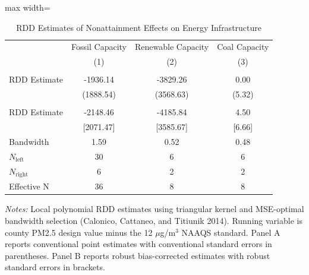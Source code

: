 \begin{table}[htbp]
\centering
\caption{RDD Estimates of Nonattainment Effects on Energy Infrastructure}
\label{tab:main_results}
\begin{adjustbox}{max width=\textwidth}
\begin{tabular}{l*{3}{c}}
\toprule
 & Fossil Capacity & Renewable Capacity & Coal Capacity \\
 & (1) & (2) & (3) \\
\midrule
\addlinespace
\multicolumn{4}{l}{\textit{Panel A: Conventional}} \\
\addlinespace
RDD Estimate & -1936.14 & -3829.26 & 0.00 \\
 & (1888.54) & (3568.63) & (5.32) \\
\addlinespace
\multicolumn{4}{l}{\textit{Panel B: Robust Bias-Corrected}} \\
\addlinespace
RDD Estimate & -2148.46 & -4185.84 & 4.50 \\
 & [2071.47] & [3585.67] & [6.66] \\
\addlinespace
\midrule
Bandwidth & 1.59 & 0.52 & 0.48 \\
$N_{\text{left}}$ & 30 &  6 &  6 \\
$N_{\text{right}}$ & 6 & 2 & 2 \\
Effective N & 36 &  8 &  8 \\
\bottomrule
\end{tabular}
\end{adjustbox}
\begin{tablenotes}
\small
\item \textit{Notes:} Local polynomial RDD estimates using triangular kernel and MSE-optimal bandwidth selection (Calonico, Cattaneo, and Titiunik 2014). Running variable is county PM2.5 design value minus the 12 $\mu$g/m$^3$ NAAQS standard. Panel A reports conventional point estimates with conventional standard errors in parentheses. Panel B reports robust bias-corrected estimates with robust standard errors in brackets.
\end{tablenotes}
\end{table}
